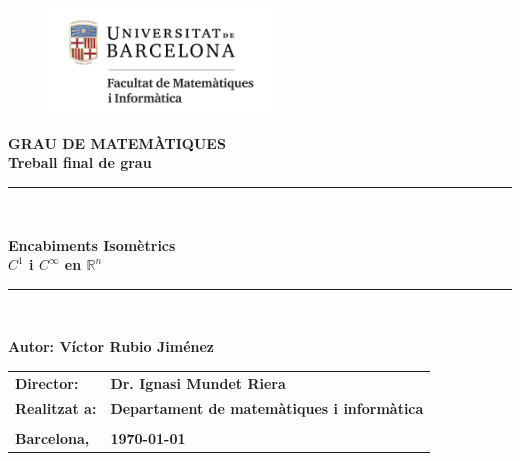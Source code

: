 \documentclass[11pt,a4paper,openright,oneside]{book}
\numberwithin{equation}{section}
\theoremstyle{definition}
\begin{document}

\thispagestyle{empty}

\begin{titlepage}
\begin{center}
\begin{figure}[htb]
\begin{center}
\includegraphics[width=6cm]{matematiquesinformatica-pos-rgb.png}
\end{center}
\end{figure}

\vspace*{1cm}
\textbf{\LARGE GRAU DE MATEM\`{A}TIQUES } \\
\vspace*{.5cm}
\textbf{\LARGE Treball final de grau} \\

\vspace*{1.5cm}
\rule{16cm}{0.1mm}\\
\begin{Huge}
\textbf{Encabiments Isomètrics\\ $C^1$ i $C^\infty$ en $\mathbb R^n$} \\
\end{Huge}
\rule{16cm}{0.1mm}\\

\vspace{1cm}

\begin{flushright}
\textbf{\LARGE Autor: Víctor Rubio Jiménez}

\vspace*{2cm}

\renewcommand{\arraystretch}{1.5}
\begin{tabular}{ll}
\textbf{\Large Director:} & \textbf{\Large Dr. Ignasi Mundet Riera } \\
\textbf{\Large Realitzat a:} & \textbf{\Large  Departament de matemàtiques i informàtica   } \\
\\
\textbf{\Large Barcelona,} & \textbf{\Large \today }
\end{tabular}
\end{flushright}
\end{center}
\end{titlepage}
\end{document}
